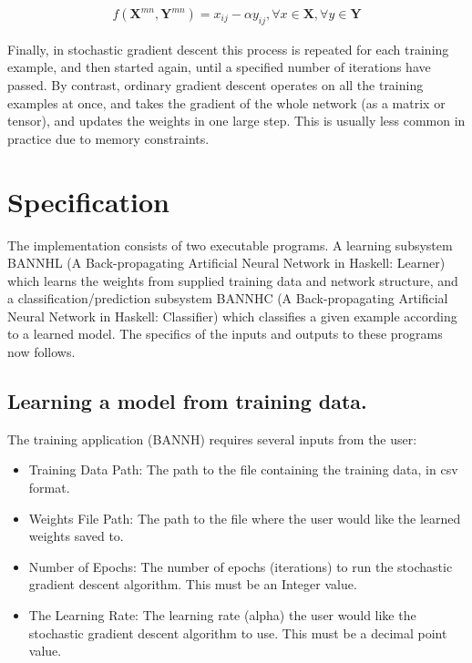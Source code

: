 \documentclass[a4paper]{article}
\begin{document}
\begin{align*}
				f(\boldsymbol{X}^{mn}, \boldsymbol{Y}^{mn}) = x_{ij} - \alpha y_{ij}, 
				\forall x \in \boldsymbol{X}, \forall y \in \boldsymbol{Y}
\end{align*}

Finally, in stochastic gradient descent this process is repeated for each 
training example, and then started again, until a specified number of
iterations have passed. By contrast, ordinary gradient descent operates
on all the training examples at once, and takes the gradient of the whole
network (as a matrix or tensor), and updates the weights in one large step.
This is usually less common in practice due to memory constraints.

\section{Specification} \label{specification}
The implementation consists of two executable programs. A learning subsystem 
BANNHL (A Back-propagating Artificial Neural Network in Haskell: Learner) 
which learns the weights from supplied training data and network structure, 
and a 
classification/prediction subsystem BANNHC (A Back-propagating Artificial Neural Network in Haskell:
Classifier) which classifies a given example according to a learned 
model. The specifics of the inputs and outputs to these programs now follows.

\subsection{Learning a model from training data.}
The training application (BANNH) requires several inputs from the 
user: 
\begin{itemize}
   \item Training Data Path: The path to the file containing the training 
      data, in csv format. 
   \item Weights File Path: The path to the file where the user would like 
      the learned weights saved to.
   \item Number of Epochs: The number of epochs (iterations) to run the
      stochastic gradient descent algorithm. This must be an Integer value.
   \item The Learning Rate: The learning rate (alpha) the user would
      like the stochastic gradient descent algorithm to use. This must be
      a decimal point value.
\end{itemize}
\end{document}
